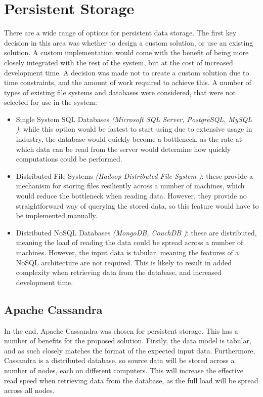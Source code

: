 \section{Persistent Storage}
There are a wide range of options for persistent data storage. The first key decision in this area was whether to design a custom solution, or use an existing solution. A custom implementation would come with the benefit of being more closely integrated with the rest of the system, but at the cost of increased development time. A decision was made not to create a custom solution due to time constraints, and the amount of work required to achieve this. A number of types of existing file systems and databases were considered, that were not selected for use in the system:
\begin{itemize}
	\item Single System SQL Databases \textit{(Microsoft SQL Server, PostgreSQL, MySQL )}: while this option would be fastest to start using due to extensive   usage in industry, the database would quickly become a bottleneck, as the rate at which data can be read from the server would determine how quickly computations could be performed.
	\item Distributed File Systems \textit{(Hadoop Distributed File System )}: these provide a mechanism for storing files resiliently across a number of machines, which would reduce the bottleneck when reading data. However, they provide no straightforward way of querying the stored data, so this feature would have to be implemented manually.
	\item Distributed NoSQL Databases \textit{(MongoDB, CouchDB )}: these are distributed, meaning the load of reading the data could be spread across a number of machines. However, the input data is tabular, meaning the features of a NoSQL architecture are not required. This is likely to result in added complexity when retrieving data from the database, and increased development time.
\end{itemize}

\subsection{Apache Cassandra} 
In the end, Apache Cassandra  was chosen for persistent storage. This has a number of benefits for the proposed solution. Firstly, the data model is tabular, and as such closely matches the format of the expected input data. Furthermore, Cassandra is a distributed database, so source data will be stored across a number of nodes, each on different computers. This will increase the effective read speed when retrieving data from the database, as the full load will be spread across all nodes.

